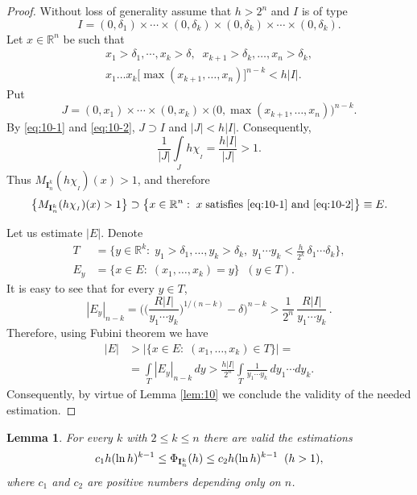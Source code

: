 \documentclass[12pt,reqno]{article}
\newtheorem{lemma}{Lemma}
\theoremstyle{remark}
\begin{document}
\begin{proof}
Without loss of generality assume that $h>2^n$ and $I$ is of type
$$  I=(0,\delta_1)\times\cdots\times(0,\delta_k)\times(0,\delta_k)\times\cdots\times(0,\delta_{k}).       $$
Let $x\in\mathbb{R}^n$ be such that
\begin{gather}
    x_1> \delta_1,\cdots, x_k>\delta, \;\; x_{k+1}> \delta_k,\dots,x_n>\delta_{k}, \label{eq:10-1} \\
    x_{1}\dots x_k \big[\max(x_{k+1},\dots, x_n)\big]^{n-k} <h|I|. \label{eq:10-2}
\end{gather}
Put
$$  J=(0,x_{1})\times\cdots\times(0,x_k)\times\big(0,\max(x_{k+1},\dots,x_n)\big)^{n-k}. $$
By \eqref{eq:10-1} and \eqref{eq:10-2}, $J\supset I$ and $|J|<h|I|$. Consequently,
$$  \frac{1}{|J|} \int\limits_J h\chi_{{}_I}=\frac{h|I|}{|J|}>1.        $$
Thus $M_{\textbf{I}_n^k}(h\chi_{{}_I})(x)>1$, and therefore
$$  \big\{M_{\textbf{I}_n^k}(h\chi_{{}_I})(x)>1\big\}\supset\big\{x\in\mathbb{R}^n:\;x\;\text{satisfies \eqref{eq:10-1} and \eqref{eq:10-2}}\big\}\equiv E. $$

Let us estimate $|E|$. Denote
\begin{align*}
    T & =\Big\{y\in\mathbb{R}^{k}:\;y_1>\delta_1,\dots,y_{k}>\delta_{k},\;y_1\cdots y_{k}<\frac{h}{2^k}\,\delta_1\cdots\delta_{k}\Big\}, \\
    E_y & =\Big\{x\in E:\;(x_{1},\dots,x_k)=y\Big\} \;\; (y\in T).
\end{align*}
It is easy to see that for every $y\in T$,
$$  |E_y|_{n-k}=\Big(\Big(\frac{R|I|}{y_1\cdots y_{k}}\Big)^{1/(n-k)}-\delta\Big)^{n-k}>\frac{1}{2^n}\,\frac{R|I|}{y_1\cdots y_{k}}\,.  $$
Therefore, using Fubini theorem we have
\begin{align*}
    |E| & >\big|\big\{x\in E:\;(x_{1},\dots,x_k)\in T\big\}\big|= \\
    & =\int\limits_T |E_y|_{n-k}\,dy>\frac{h|I|}{2^n}\int\limits_T \frac{1}{y_1\cdots y_{k}}\,dy_1\cdots dy_{k}.
\end{align*}
Consequently, by virtue of Lemma \ref{lem:10} we conclude the validity of the needed estimation.
\end{proof}

\begin{lemma}\label{lem:11}
For every $k$ with $2\leq k\leq n$ there are valid the estimations
$$  c_1h(\ln h)^{k-1}\leq\Phi_{\bold{I}_n^k}(h)\leq c_2h(\ln h)^{k-1} \;\; (h>1),      $$
where $c_1$ and $c_2$ are positive numbers depending only on $n$.
\end{lemma}
\end{document}

